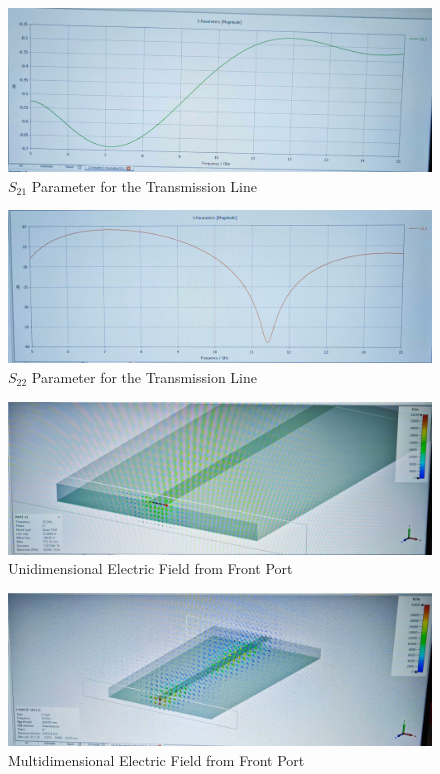 \documentclass[
	letterpaper, %
	10pt, %
]{CSUniSchoolLabReport}
\begin{document}
\begin{figure}[H]
  \centering
  \includegraphics[width=.9\textwidth]{Figures/Lab Four/Line_S21.jpg}
  \caption{$S_{21}$ Parameter for the Transmission Line}
  \label{fig:3}
\end{figure}

\begin{figure}[H]
  \centering
  \includegraphics[width=.9\textwidth]{Figures/Lab Four/Line_S22.jpg}
  \caption{$S_{22}$ Parameter for the Transmission Line}
  \label{fig:4}
\end{figure}

\begin{figure}[H]
  \centering
  \includegraphics[width=.9\textwidth]{Figures/Lab Four/Front_EField.jpg}
  \caption{Unidimensional Electric Field from Front Port}
  \label{fig:5}
\end{figure}

\begin{figure}[H]
  \centering
  \includegraphics[width=.9\textwidth]{Figures/Lab Four/Front_EField_3D.jpg}
  \caption{Multidimensional Electric Field from Front Port}
  \label{fig:6}
\end{figure}
\end{document}
